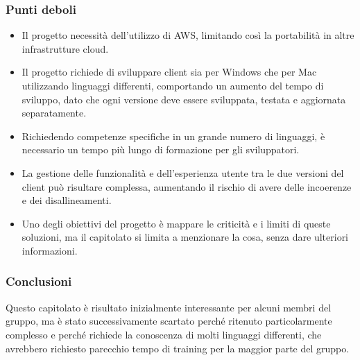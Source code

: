     \subsubsection{Punti deboli}
    \begin{itemize}
    \item Il progetto necessità dell’utilizzo di AWS, limitando così la portabilità in altre infrastrutture cloud.
    \item Il progetto richiede di sviluppare client sia per Windows che per Mac utilizzando linguaggi differenti, comportando un aumento del tempo di sviluppo, dato che ogni versione deve essere sviluppata, testata e aggiornata separatamente.
    \item Richiedendo competenze specifiche in un grande numero di linguaggi, è necessario un tempo più lungo di formazione per gli sviluppatori.
    \item La gestione delle funzionalità e dell’esperienza utente tra le due versioni del client può risultare complessa, aumentando il rischio di avere delle incoerenze e dei disallineamenti.
    \item Uno degli obiettivi del progetto è mappare le criticità e i limiti di queste soluzioni, ma il capitolato si limita a menzionare la cosa, senza dare ulteriori informazioni.
\end{itemize}
    \subsubsection{Conclusioni}
   Questo capitolato è risultato inizialmente interessante per alcuni membri del gruppo, ma è stato successivamente scartato perché ritenuto particolarmente complesso e perché richiede la conoscenza di molti linguaggi differenti, che avrebbero richiesto parecchio tempo di training per la maggior parte del gruppo.
